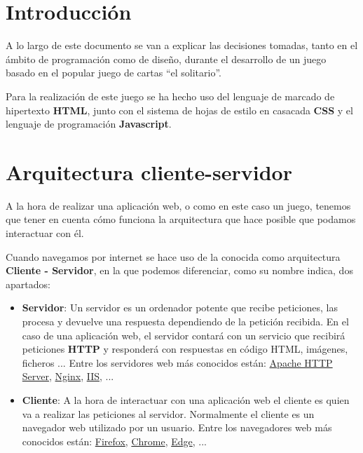 \documentclass{\ClassPath/viu-tfm-template}
\begin{document}
    \graphicspath{{../../VIU_TFM_LaTeX_template/}}

    \coverpage

    \tableofcontents

\chapter{Introducción}

A lo largo de este documento se van a explicar las decisiones tomadas, tanto en el ámbito de programación como de diseño, durante el desarrollo de un juego basado en el popular juego de cartas “el solitario”.

Para la realización de este juego se ha hecho uso del lenguaje de marcado de hipertexto \textbf{HTML}, junto con el sistema de hojas de estilo en casacada \textbf{CSS} y el lenguaje de programación \textbf{Javascript}.


\chapter{Arquitectura cliente-servidor}
A la hora de realizar una aplicación web, o como en este caso un juego, tenemos que tener en cuenta cómo funciona la arquitectura que hace posible que podamos interactuar con él.

Cuando navegamos por internet se hace uso de la conocida como arquitectura \textbf{Cliente - Servidor}, en la que podemos diferenciar, como su nombre indica, dos apartados:

\begin{itemize}
    \item \textbf{Servidor}: Un servidor es un ordenador potente que recibe peticiones, las procesa y devuelve una respuesta dependiendo de la petición recibida. En el caso de una aplicación web, el servidor contará con un servicio que recibirá peticiones \textbf{HTTP} y responderá con respuestas en código HTML, imágenes, ficheros ... Entre los servidores web más conocidos están: \href{https://httpd.apache.org/}{Apache HTTP Server}, \href{https://nginx.org/}{Nginx}, \href{https://www.iis.net/}{IIS}, ...

    \item \textbf{Cliente}: A la hora de interactuar con una aplicación web el cliente es quien va a realizar las peticiones al servidor. Normalmente el cliente es un navegador web utilizado por un usuario. Entre los navegadores web más conocidos están: \href{https://www.mozilla.org/es-ES/firefox/}{Firefox}, \href{https://www.google.com/chrome/}{Chrome}, \href{https://www.microsoft.com/es-es/edge}{Edge}, ...
\end{itemize}
\end{document}
